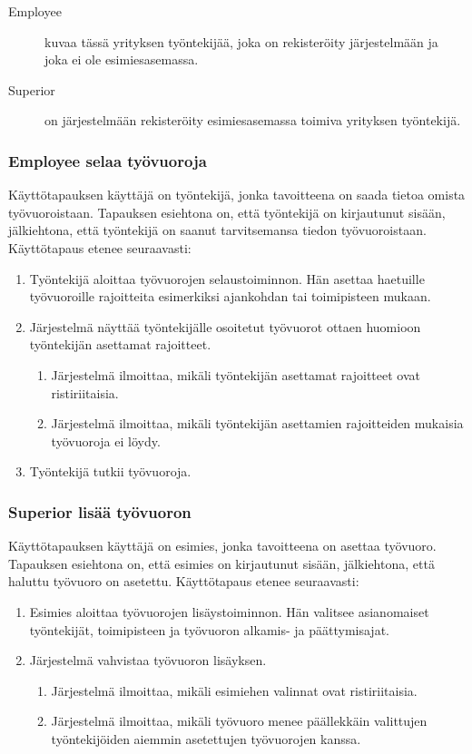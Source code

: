 \documentclass[10pt,titlepage,hidelinks]{scrartcl}
\begin{document}
\begin{description}
\item[Employee] kuvaa tässä yrityksen työntekijää, joka on rekisteröity järjestelmään ja joka ei ole esimiesasemassa.
\item[Superior] on järjestelmään rekisteröity esimiesasemassa toimiva yrityksen työntekijä.
\end{description}

\subsubsection*{Employee selaa työvuoroja}

Käyttötapauksen käyttäjä on työntekijä, jonka tavoitteena on saada tietoa omista työvuoroistaan. Tapauksen esiehtona on, että työntekijä on kirjautunut sisään, jälkiehtona, että työntekijä on saanut tarvitsemansa tiedon työvuoroistaan. Käyttötapaus etenee seuraavasti: \begin{enumerate}
\item Työntekijä aloittaa työvuorojen selaustoiminnon. Hän asettaa haetuille työvuoroille rajoitteita esimerkiksi ajankohdan tai toimipisteen mukaan.
\item Järjestelmä näyttää työntekijälle osoitetut työvuorot ottaen huomioon työntekijän asettamat rajoitteet. \begin{enumerate}
\item Järjestelmä ilmoittaa, mikäli työntekijän asettamat rajoitteet ovat ristiriitaisia.
\item Järjestelmä ilmoittaa, mikäli työntekijän asettamien rajoitteiden mukaisia työvuoroja ei löydy.
\end{enumerate}
\item Työntekijä tutkii työvuoroja.
\end{enumerate}

\subsubsection*{Superior lisää työvuoron}

Käyttötapauksen käyttäjä on esimies, jonka tavoitteena on asettaa työvuoro. Tapauksen esiehtona on, että esimies on kirjautunut sisään, jälkiehtona, että haluttu työvuoro on asetettu. Käyttötapaus etenee seuraavasti: \begin{enumerate}
\item Esimies aloittaa työvuorojen lisäystoiminnon. Hän valitsee asianomaiset työntekijät, toimipisteen ja työvuoron alkamis- ja päättymisajat.
\item Järjestelmä vahvistaa työvuoron lisäyksen. \begin{enumerate}
\item Järjestelmä ilmoittaa, mikäli esimiehen valinnat ovat ristiriitaisia.
\item Järjestelmä ilmoittaa, mikäli työvuoro menee päällekkäin valittujen työntekijöiden aiemmin asetettujen työvuorojen kanssa.
\end{enumerate}
\end{enumerate}
\end{document}

